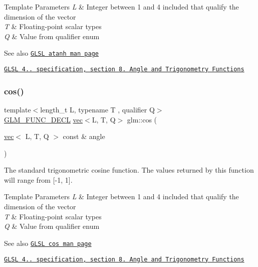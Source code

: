 \begin{DoxyTemplParams}{Template Parameters}
{\em L} & Integer between 1 and 4 included that qualify the dimension of the vector \\
\hline
{\em T} & Floating-\/point scalar types \\
\hline
{\em Q} & Value from qualifier enum\\
\hline
\end{DoxyTemplParams}
\begin{DoxySeeAlso}{See also}
\href{http://www.opengl.org/sdk/docs/manglsl/xhtml/atanh.xml}{\tt G\+L\+SL atanh man page} 

\href{http://www.opengl.org/registry/doc/GLSLangSpec.4.20.8.pdf}{\tt G\+L\+SL 4.. specification, section 8. Angle and Trigonometry Functions} 
\end{DoxySeeAlso}
\mbox{\label{group__core__func__trigonometric_ga6a41efc740e3b3c937447d3a6284130e}} 
\subsubsection{\texorpdfstring{cos()}{cos()}}
{\footnotesize\ttfamily template$<$length\+\_\+t L, typename T , qualifier Q$>$ \\
\mbox{\hyperlink{setup_8hpp_ab2d052de21a70539923e9bcbf6e83a51}{G\+L\+M\+\_\+\+F\+U\+N\+C\+\_\+\+D\+E\+CL}} \mbox{\hyperlink{structglm_1_1vec}{vec}}$<$L, T, Q$>$ glm\+::cos (\begin{DoxyParamCaption}\item[{\mbox{\hyperlink{structglm_1_1vec}{vec}}$<$ L, T, Q $>$ const \&}]{angle }\end{DoxyParamCaption})}

The standard trigonometric cosine function. The values returned by this function will range from \mbox{[}-\/1, 1\mbox{]}.


\begin{DoxyTemplParams}{Template Parameters}
{\em L} & Integer between 1 and 4 included that qualify the dimension of the vector \\
\hline
{\em T} & Floating-\/point scalar types \\
\hline
{\em Q} & Value from qualifier enum\\
\hline
\end{DoxyTemplParams}
\begin{DoxySeeAlso}{See also}
\href{http://www.opengl.org/sdk/docs/manglsl/xhtml/cos.xml}{\tt G\+L\+SL cos man page} 

\href{http://www.opengl.org/registry/doc/GLSLangSpec.4.20.8.pdf}{\tt G\+L\+SL 4.. specification, section 8. Angle and Trigonometry Functions} 
\end{DoxySeeAlso}
\mbox{\label{group__core__func__trigonometric_ga4e260e372742c5f517aca196cf1e62b3}} 
